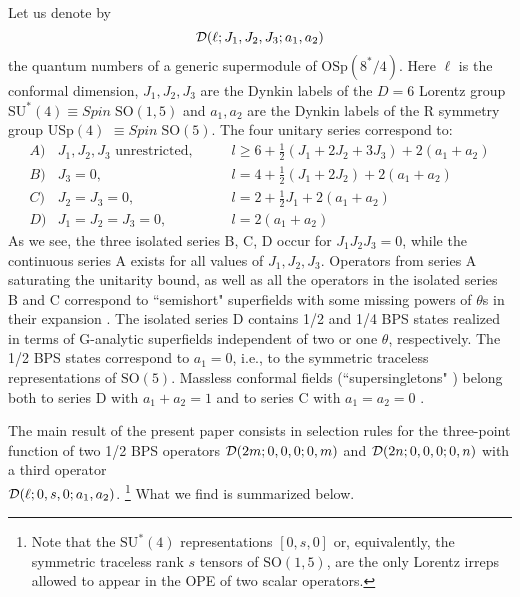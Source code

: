 \documentclass[a4paper,11pt]{article}
\begin{document}
Let us denote by
\begin{equation}\label{calD}
  {\cal
D}(\ell;J_1,J_2,J_3;a_1,a_2)
\end{equation}
the quantum numbers of a generic supermodule of $\mbox{OSp}(8^{*}/4)$. Here
$\ell$ is the conformal dimension, $J_1,J_2,J_3$ are the Dynkin labels of the
$D=6$ Lorentz group $\mbox{SU}^{*}(4)\equiv  Spin\;\mbox{SO}(1,5)$ and
$a_1,a_2$ are the Dynkin labels of the R symmetry group $\mbox{USp}(4)$ $\equiv
Spin\; \mbox{SO}(5)$. The four unitary series correspond to:
\begin{equation}\label{6.33'}
  \begin{array}{lll}
   A) & J_1,J_2,J_3\mbox{ unrestricted,} \qquad  & l \geq 6 + \frac{1}{2}
(J_1+2 J_2+3 J_3) + 2(a_1+a_2)
 \\
 B) & J_3 = 0, \qquad & l = 4 + \frac{1}{2} (J_1+2 J_2)
+ 2(a_1+a_2)  \\
 C) & J_2=J_3=0, \qquad & l = 2 + \frac{1}{2} J_1 + 2(a_1+a_2)  \\
 D) & J_1=J_2=J_3=0,
\qquad & l = 2 (a_1+a_2)
  \end{array}
\end{equation}
As we see, the  three isolated series B, C, D occur for $J_1 J_2
J_3 = 0$, while the  continuous series A exists for all values of
$J_1,J_2,J_3$. Operators from  series A saturating the unitarity
bound, as well as all the operators in the isolated series B and C
correspond to ``semishort" superfields with some missing powers of
$\theta$s in their expansion \cite{FS1}. The isolated series D
contains 1/2 and 1/4 BPS states realized in terms of G-analytic
superfields independent of two or one $\theta$, respectively. The
1/2 BPS states correspond to $a_1=0$, i.e., to the symmetric
traceless representations of $\mbox{SO}(5)$. Massless conformal
fields (``supersingletons" \cite{ff2}) belong both to series D
with $a_1+a_2=1$ and to series C with $a_1=a_2=0$
\cite{GT,Fernando:2001ak}.

The main result of the present paper consists in selection rules
for the three-point function of two 1/2 BPS operators ${\cal
D}(2m;0,0,0;0,m)$ and ${\cal D}(2n;0,0,0;0,n)$ with a third
operator\\ ${\cal D}(\ell;0,s,0;a_1,a_2)$. \footnote{Note that the
$\mbox{SU}^{*}(4)$ representations $[0,s,0]$ or, equivalently, the
symmetric traceless rank $s$ tensors of $\mbox{SO}(1,5)$, are the
only Lorentz irreps allowed to appear in the OPE of two scalar
operators.} What we find is summarized below.
\end{document}
